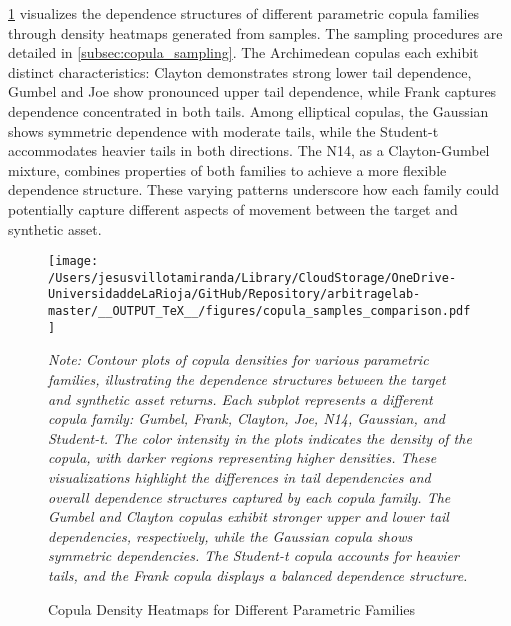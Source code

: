\cref{fig:copula_samples_comparison} visualizes the dependence structures of different parametric copula families through density heatmaps generated from samples. The sampling procedures are detailed in \cref{subsec:copula_sampling}. The Archimedean copulas each exhibit distinct characteristics: Clayton demonstrates strong lower tail dependence, Gumbel and Joe show pronounced upper tail dependence, while Frank captures dependence concentrated in both tails. Among elliptical copulas, the Gaussian shows symmetric dependence with moderate tails, while the Student-t accommodates heavier tails in both directions. The N14, as a Clayton-Gumbel mixture, combines properties of both families to achieve a more flexible dependence structure. These varying patterns underscore how each family could potentially capture different aspects of movement between the target and synthetic asset.

\begin{figure}[H]
  \caption{Copula Density Heatmaps for Different Parametric Families}
  \centering
  \texttt{[image: /Users/jesusvillotamiranda/Library/CloudStorage/OneDrive-UniversidaddeLaRioja/GitHub/Repository/arbitragelab-master/\_\_OUTPUT\_TeX\_\_/figures/copula\_samples\_comparison.pdf]}
  \label{fig:copula_samples_comparison}
\vspace{0.5cm}
\begin{minipage}{\textwidth}
\setlength{\parindent}{0pt}
\small\textit{Note: 
Contour plots of copula densities for various parametric families, illustrating the dependence structures between the target and synthetic asset returns. Each subplot represents a different copula family: Gumbel, Frank, Clayton, Joe, N14, Gaussian, and Student-t. The color intensity in the plots indicates the density of the copula, with darker regions representing higher densities. These visualizations highlight the differences in tail dependencies and overall dependence structures captured by each copula family. The Gumbel and Clayton copulas exhibit stronger upper and lower tail dependencies, respectively, while the Gaussian copula shows symmetric dependencies. The Student-t copula accounts for heavier tails, and the Frank copula displays a balanced dependence structure. 
}
\end{minipage}

\end{figure}


